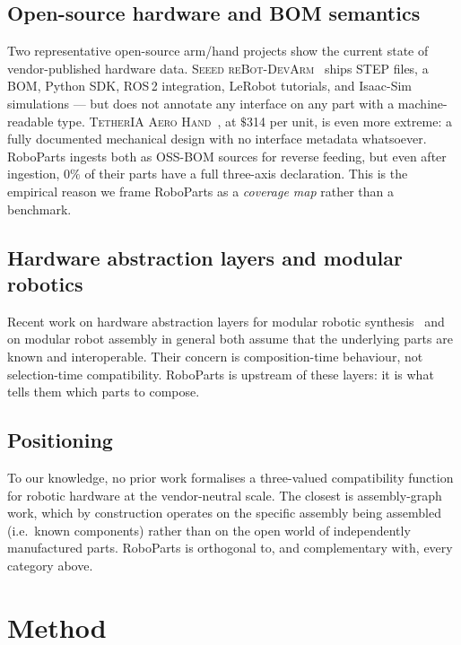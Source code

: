 \subsection{Open-source hardware and BOM semantics}

Two representative open-source arm/hand projects show the current
state of vendor-published hardware data. \textsc{Seeed reBot-DevArm}~\cite{R14}
ships STEP files, a BOM, Python SDK, ROS\,2 integration, LeRobot
tutorials, and Isaac-Sim simulations — but does not annotate any
interface on any part with a machine-readable type. \textsc{TetherIA
Aero Hand}~\cite{R15}, at $\$$314 per unit, is even more extreme:
a fully documented mechanical design with no interface metadata
whatsoever. RoboParts ingests both as OSS-BOM sources for reverse
feeding, but even after ingestion, $0\%$ of their parts have a full
three-axis declaration. This is the empirical reason we frame RoboParts
as a \emph{coverage map} rather than a benchmark.

\subsection{Hardware abstraction layers and modular robotics}

Recent work on hardware abstraction layers for modular robotic
synthesis~\cite{R16} and on modular robot assembly in general both
assume that the underlying parts are known and interoperable. Their
concern is composition-time behaviour, not selection-time
compatibility. RoboParts is upstream of these layers: it is what
tells them which parts to compose.

\subsection{Positioning}

To our knowledge, no prior work formalises a three-valued
compatibility function for robotic hardware at the vendor-neutral
scale. The closest is assembly-graph work, which by construction
operates on the specific assembly being assembled (i.e.\ known
components) rather than on the open world of independently
manufactured parts. RoboParts is orthogonal to, and complementary
with, every category above.

\section{Method}

